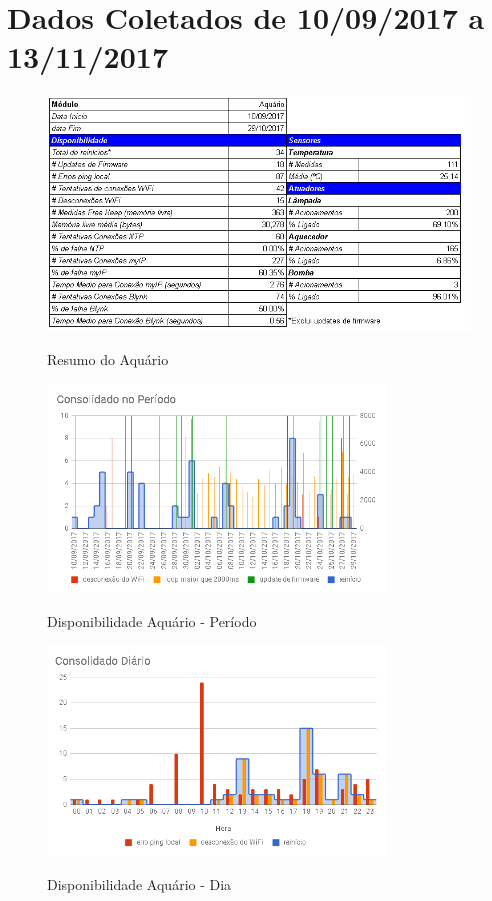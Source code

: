\chapter{Dados Coletados de 10/09/2017 a 13/11/2017}
\label{DataCollected}

\begin{figure}[H]
	\centering
	\caption{Resumo do Aquário}
	\includegraphics[width=1.0\textwidth]{resumoAqua}
	\label{fig:resumoAqua}
\end{figure}

\begin{figure}[H]
	\centering
	\caption{Disponibilidade Aquário - Período}
	\includegraphics[width=0.8\textwidth]{AquaPeriodo}
	\label{fig:AquaPeriodo}
\end{figure}

\begin{figure}[H]
	\centering
	\caption{Disponibilidade Aquário - Dia}
	\includegraphics[width=0.8\textwidth]{AquaDiaDisp}
	\label{fig:AquaDiaDisp}
\end{figure}


